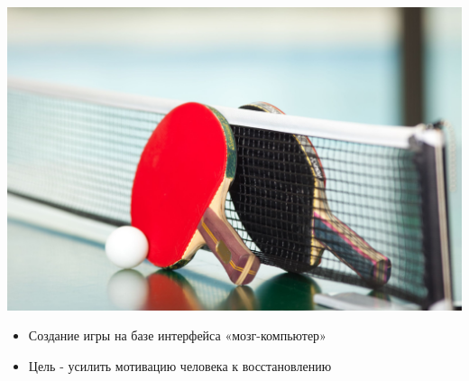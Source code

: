 \begin{frame}
\frametitle{\insertsection} 
\framesubtitle{\insertsubsection}
\begin{minipage}[h]{0.4\linewidth}
    \includegraphics[width=\linewidth]{3.jpg}
\end{minipage}
\hfill 
\begin{minipage}[h]{0.5\linewidth}
    \begin{itemize}
        \item Создание игры на базе интерфейса «мозг-компьютер» 
        \item Цель - усилить мотивацию человека к восстановлению 
    \end{itemize}
\end{minipage}
\end{frame}